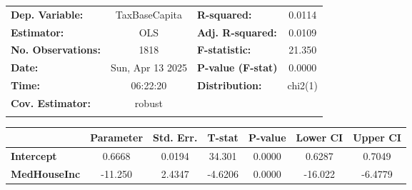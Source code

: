 \begin{center}
\begin{tabular}{lclc}
\toprule
\textbf{Dep. Variable:}    &   TaxBaseCapita    & \textbf{  R-squared:         } &      0.0114      \\
\textbf{Estimator:}        &        OLS         & \textbf{  Adj. R-squared:    } &      0.0109      \\
\textbf{No. Observations:} &        1818        & \textbf{  F-statistic:       } &      21.350      \\
\textbf{Date:}             &  Sun, Apr 13 2025  & \textbf{  P-value (F-stat)   } &      0.0000      \\
\textbf{Time:}             &      06:22:20      & \textbf{  Distribution:      } &     chi2(1)      \\
\textbf{Cov. Estimator:}   &       robust       & \textbf{                     } &                  \\
\textbf{}                  &                    & \textbf{                     } &                  \\
\bottomrule
\end{tabular}
\begin{tabular}{lcccccc}
                     & \textbf{Parameter} & \textbf{Std. Err.} & \textbf{T-stat} & \textbf{P-value} & \textbf{Lower CI} & \textbf{Upper CI}  \\
\midrule
\textbf{Intercept}   &       0.6668       &       0.0194       &      34.301     &      0.0000      &       0.6287      &       0.7049       \\
\textbf{MedHouseInc} &      -11.250       &       2.4347       &     -4.6206     &      0.0000      &      -16.022      &      -6.4779       \\
\bottomrule
\end{tabular}
\end{center}